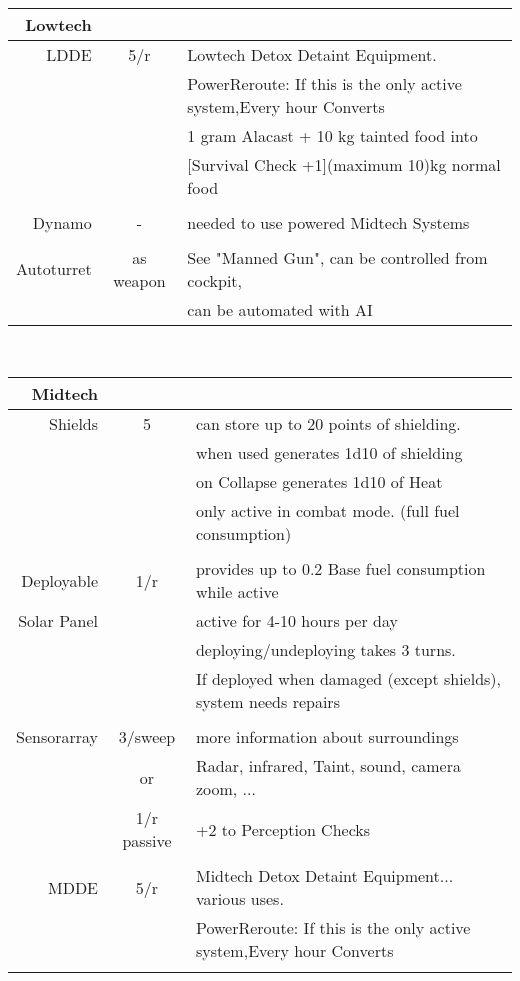 \documentclass{article}
\begin{document}
\begin{tabular}{rcl}
\end{tabular}\\\begin{tabular}{rcl} \\Lowtech\\\hline
LDDE & 5/r & Lowtech Detox Detaint Equipment. \\&&PowerReroute: If this is the only active system,Every hour Converts \\&&
             1 gram Alacast + 10 kg tainted food into \\&& [Survival Check +1](maximum 10)kg normal food\\\\
Dynamo & - & needed to use powered Midtech Systems\\\\
Autoturret & as weapon & See "Manned Gun", can be controlled from cockpit, \\&&can be automated with AI\\
\end{tabular}\\\begin{tabular}{rcl} \\Midtech\\\hline
Shields & 5 & can store up to 20 points of shielding.\\&& when used generates 1d10 of shielding
            \\&&on Collapse generates 1d10 of Heat\\&&only active in combat mode. (full fuel consumption)\\\\
Deployable & 1/r & provides up to 0.2 Base fuel consumption while active\\
Solar Panel&& active for 4-10 hours per day\\
 &  & deploying/undeploying takes 3 turns. \\&& If deployed when damaged (except shields), system needs repairs\\\\
Sensorarray & 3/sweep & more information about surroundings\\
 &          or & Radar, infrared, Taint, sound, camera zoom, ...\\
 & 1/r passive & +2 to Perception Checks\\\\
MDDE & 5/r & Midtech Detox Detaint Equipment... various uses. \\&&PowerReroute: If this is the only active system,Every hour Converts \\&&

\end{tabular}
\end{document}
